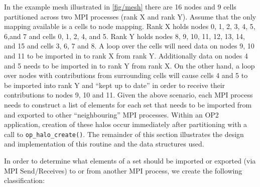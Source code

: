 \documentclass[11pt]{article}
\begin{document}
\noindent In the example mesh illustrated in \figurename{ \ref{fig/mesh}} there are 16 nodes and 9 cells partitioned
across two MPI processes (rank X and rank Y). Assume that the only mapping available is a cells to node mapping. Rank X
holds nodes 0, 1, 2, 3, 4, 5, 6,and 7 and cells 0, 1, 2, 4, and 5. Rank Y holds nodes 8, 9, 10, 11, 12, 13, 14,  and 15
and cells 3, 6, 7 and 8. A loop over the cells will need data on nodes 9, 10 and 11 to be imported in to rank X from
rank Y. Additionally data on nodes 4 and 5 needs to be imported in to rank Y from rank X. On the other hand, a loop over
nodes with contributions from surrounding cells will cause cells 4 and 5 to be imported into rank Y and ``kept up to
date'' in order to receive their contributions to nodes 9, 10 and 11. Given the above scenario, each MPI process needs
to construct a list of elements for each set that needs to be
imported from and exported to other ``neighbouring'' MPI processes. Within an OP2 application, creation of these
halos occur immediately after partitioning with a call to \texttt{op\_halo\_create()}. The remainder of this section
illustrates the design and implementation of this routine and the data structures used.

\noindent In order to determine what elements of a set should be imported or exported (via MPI Send/Receives) to or from
another MPI process, we create the following classification:
\end{document}
